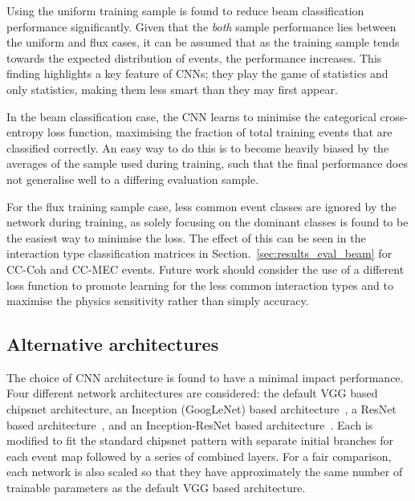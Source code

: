 Using the uniform training sample is found to reduce beam classification performance
significantly. Given that the \emph{both} sample performance lies between the uniform and flux
cases, it can be assumed that as the training sample tends towards the expected distribution of
events, the performance increases. This finding highlights a key feature of CNNs; they play the
game of statistics and only statistics, making them less smart than they may first appear.

In the beam classification case, the CNN learns to minimise the categorical cross-entropy loss
function, maximising the fraction of total training events that are classified correctly. An easy
way to do this is to become heavily biased by the averages of the sample used during training,
such that the final performance does not generalise well to a differing evaluation sample.

For the flux training sample case, less common event classes are ignored by the network during
training, as solely focusing on the dominant classes is found to be the easiest way to minimise
the loss. The effect of this can be seen in the interaction type classification matrices in
Section.~\ref{sec:results_eval_beam} for CC-Coh and CC-MEC events. Future work should consider the
use of a different loss function to promote learning for the less common interaction types and to
maximise the physics sensitivity rather than simply accuracy.

\subsection{Alternative architectures} %
\label{sec:results_alt_arch} %

The choice of CNN architecture is found to have a minimal impact performance. Four different
network architectures are considered: the default VGG based chipsnet architecture, an Inception
(GoogLeNet) based architecture~\cite{szegedy2015}, a ResNet based
architecture~\cite{he2016_improved}, and an Inception-ResNet based
architecture~\cite{szegedy2016}. Each is modified to fit the standard chipsnet pattern with
separate initial branches for each event map followed by a series of combined layers. For a fair
comparison, each network is also scaled so that they have approximately the same number of
trainable parameters as the default VGG based architecture.

